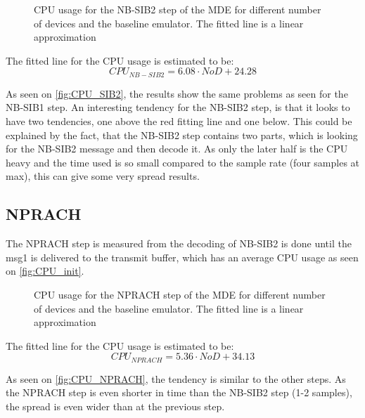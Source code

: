 \begin{figure}[H]
\centering
\resizebox{0.5\textwidth}{!}{
}
\caption{CPU usage for the NB-SIB2 step of the MDE for different number of devices and the baseline emulator. The fitted line is a linear approximation}
\label{fig:CPU_SIB2}
\end{figure}

The fitted line for the CPU usage is estimated to be:
\begin{equation}
CPU_{NB-SIB2} = 6.08 \cdot NoD + 24.28
\end{equation}

As seen on \autoref{fig:CPU_SIB2}, the results show the same problems as seen for the NB-SIB1 step. An interesting tendency for the NB-SIB2 step, is that it looks to have two tendencies, one above the red fitting line and one below. This could be explained by the fact, that the NB-SIB2 step contains two parts, which is looking for the NB-SIB2 message and then decode it. As only the later half is the CPU heavy and the time used is so small compared to the sample rate (four samples at max), this can give some very spread results. 



\subsection{NPRACH}
The NPRACH step is measured from the decoding of NB-SIB2 is done until the msg1 is delivered to the transmit buffer, which has an average CPU usage as seen on \autoref{fig:CPU_init}.

\begin{figure}[H]
\centering
\resizebox{0.5\textwidth}{!}{
}
\caption{CPU usage for the NPRACH step of the MDE for different number of devices and the baseline emulator. The fitted line is a linear approximation}
\label{fig:CPU_NPRACH}
\end{figure}

The fitted line for the CPU usage is estimated to be:
\begin{equation}
CPU_{NPRACH} = 5.36 \cdot NoD + 34.13
\end{equation}

As seen on \autoref{fig:CPU_NPRACH}, the tendency is similar to the other steps. As the NPRACH step is even shorter in time than the NB-SIB2 step (1-2 samples), the spread is even wider than at the previous step.

